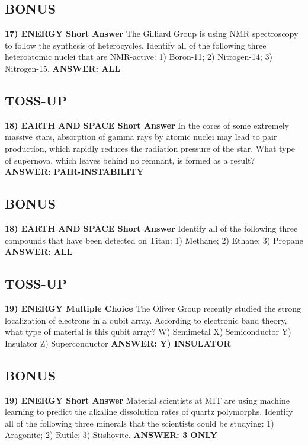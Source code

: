 \documentclass{article}
\begin{document}
\subsection*{BONUS}
\textbf{17) ENERGY Short Answer} The Gilliard Group is using NMR spectroscopy to follow the synthesis of heterocycles. Identify all of the following three heteroatomic nuclei that are NMR-active: 1) Boron-11; 2) Nitrogen-14; 3) Nitrogen-15.
\newline
\textbf{ANSWER: ALL}

\subsection*{TOSS-UP}
\textbf{18) EARTH AND SPACE Short Answer} In the cores of some extremely massive stars, absorption of gamma rays by atomic nuclei may lead to pair production, which rapidly reduces the radiation pressure of the star. What type of supernova, which leaves behind no remnant, is formed as a result?
\newline
\textbf{ANSWER: PAIR-INSTABILITY}

\subsection*{BONUS}
\textbf{18) EARTH AND SPACE Short Answer} Identify all of the following three compounds that have been detected on Titan: 1) Methane; 2) Ethane; 3) Propane
\newline
\textbf{ANSWER: ALL}

\subsection*{TOSS-UP}
\textbf{19) ENERGY Multiple Choice} The Oliver Group recently studied the strong localization of electrons in a qubit array. According to electronic band theory, what type of material is this qubit array?
\newline
W) Semimetal
\newline
X) Semiconductor
\newline
Y) Insulator
\newline
Z) Superconductor
\newline
\textbf{ANSWER: Y) INSULATOR}

\subsection*{BONUS}
\textbf{19) ENERGY Short Answer} Material scientists at MIT are using machine learning to predict the alkaline dissolution rates of quartz polymorphs. Identify all of the following three minerals that the scientists could be studying: 1) Aragonite; 2) Rutile; 3) Stishovite.
\newline
\textbf{ANSWER: 3 ONLY}
\end{document}
